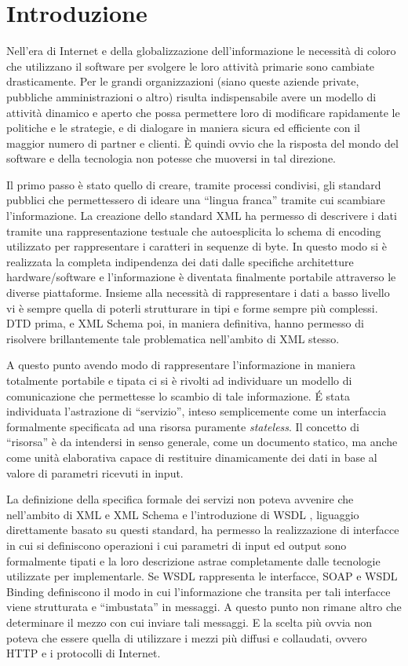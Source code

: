\chapter{Introduzione}

Nell'era di Internet e della globalizzazione dell'informazione le necessità di
coloro che utilizzano il software per svolgere le loro attività primarie sono
cambiate drasticamente. Per le grandi organizzazioni (siano queste aziende
private, pubbliche amministrazioni o altro) risulta indispensabile avere un
modello di attività dinamico e aperto che possa permettere loro di modificare
rapidamente le politiche e le strategie, e di dialogare in maniera sicura ed
efficiente con il maggior numero di partner e clienti. \`E quindi ovvio che la
risposta del mondo del software e della tecnologia non potesse che muoversi in
tal direzione. 

Il primo passo è stato quello di creare, tramite processi condivisi, gli
standard pubblici che permettessero di ideare una ``lingua franca'' tramite cui
scambiare l'informazione. La creazione dello standard XML \cite{XML} ha permesso di
descrivere i dati tramite una rappresentazione testuale che autoesplicita lo schema di
encoding utilizzato per rappresentare i caratteri in sequenze di byte. In questo
modo si è realizzata la completa indipendenza dei dati dalle specifiche
architetture hardware/software e l'informazione è diventata finalmente portabile
attraverso le diverse piattaforme. Insieme alla necessità di rappresentare i dati
a basso livello vi è sempre quella di poterli strutturare in tipi e forme sempre
più complessi. DTD \cite{XML10} prima, e XML Schema \cite{XMLSchema} poi, in
maniera definitiva, hanno permesso di risolvere brillantemente tale problematica nell'ambito di XML stesso.

A questo punto avendo modo di rappresentare l'informazione in maniera totalmente
portabile e tipata ci si è rivolti ad individuare un modello di
comunicazione che permettesse lo scambio di tale informazione. \'E stata
individuata l'astrazione di ``servizio'', inteso semplicemente come un
interfaccia formalmente specificata ad una risorsa puramente \emph{stateless}.
Il concetto di ``risorsa'' è da intendersi in senso generale, come un documento
statico, ma anche come unità elaborativa capace di restituire dinamicamente
dei dati in base al valore di parametri ricevuti in input.

La definizione della specifica formale dei servizi non poteva avvenire che
nell'ambito di XML e XML Schema e l'introduzione di WSDL \cite{WSDL}, liguaggio
direttamente basato su questi standard, ha permesso la realizzazione di
interfacce in cui si definiscono operazioni i cui parametri di input ed output
sono formalmente tipati e la loro descrizione astrae completamente dalle
tecnologie utilizzate per implementarle. Se WSDL rappresenta le interfacce, SOAP
\cite{SOAP} e WSDL Binding \cite{WSDL} definiscono il modo in cui l'informazione
che transita per tali interfacce viene strutturata e ``imbustata'' in messaggi. A
questo punto non rimane altro che determinare il mezzo con cui inviare tali
messaggi. E la scelta più ovvia non poteva che essere quella di utilizzare i
mezzi più diffusi e collaudati, ovvero HTTP e i protocolli di Internet.

